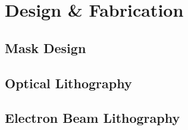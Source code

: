 \chapter{Design \& Fabrication}


\section{Mask Design}


\section{Optical Lithography}


\section{Electron Beam Lithography}

